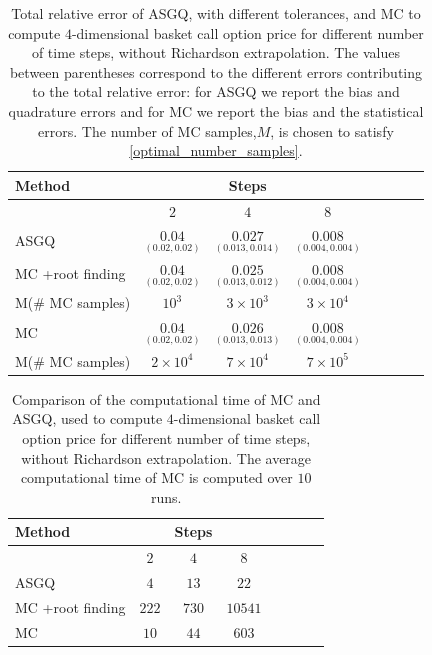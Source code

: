 \FloatBarrier
\begin{table}[h!]
	\centering
	\begin{tabular}{l*{6}{c}r}
		\toprule[1.5pt]
	Method & & Steps  & &     \\
	\hline
           & $2$ & $4$ & $8$   \\
		\hline
		ASGQ   &  $\underset{(0.02,0.02)}{\mathbf{0.04}}$ & $\underset{(0.013,0.014)}{\mathbf{0.027}}$ & $\underset{(0.004,0.004)}{\mathbf{0.008}}$   \\

		\hline		
			MC +root finding   &  $\underset{(0.02,0.02)}{\mathbf{0.04}}$ & $\underset{(0.013,0.012)}{\mathbf{0.025}}$ & $\underset{(0.004,0.004)}{\mathbf{0.008}}$  \\
			M(\# MC samples)   & $10^3$   &  $3 \times 10^3$ &  $3 \times 10^4$  \\	
		\hline	
				MC   &  $\underset{(0.02,0.02)}{\mathbf{0.04}}$ & $\underset{(0.013,0.013)}{\mathbf{0.026}}$ & $\underset{(0.004,0.004)}{\mathbf{0.008}}$   \\	
				M(\# MC samples)   &$2 \times 10^4$  & $7 \times 10^4 $  &  $7 \times 10^5 $ \\	
		
			\bottomrule[1.25pt]
	\end{tabular}
	\caption{Total relative  error of ASGQ, with different tolerances, and MC to compute $4$-dimensional basket call option price for different number of time steps, without Richardson extrapolation. The values between parentheses correspond to the different errors contributing to the total relative error: for ASGQ we report the bias and quadrature errors and for MC we report the bias and the statistical errors. The number of MC samples,$ M$, is chosen to satisfy \eqref{optimal_number_samples}.}
	\label{Total error of MISC and MC to compute 4 dim basket  Call option price of the different tolerances for different number of time steps, without Richardson extrapolation. The numbers between parentheses are the corresponding absolute errors.}
\end{table}
\FloatBarrier




\begin{table}[h!]
	\centering
	\begin{tabular}{l*{6}{c}r}
		\toprule[1.5pt]
	Method & & Steps  & &     \\
	\hline
	         & $2$ & $4$ & $8$    \\
		\hline
		ASGQ & $4$  & $13$ & $22$     \\
			MC  +root finding  & $222$&  $730$&  $10541$   \\
				MC  &   $10$& $44$ &   $603$ \\
		\bottomrule[1.25pt]
	\end{tabular}
	\caption{Comparison of the computational time of  MC and ASGQ, used to compute $4$-dimensional basket call option price  for different number of time steps, without Richardson extrapolation. The average computational time of MC is computed over $10$ runs.}
	\label{Comparsion of the computational time of  MC and MISC, used to compute 4 dim basket Call option price  for different number of time steps, without Richardson extrapolation}
\end{table}


